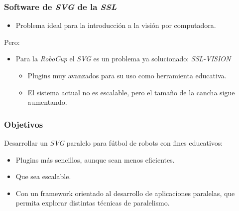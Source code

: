 \documentclass[11pt,a4paper,spanish]{beamer}
\begin{document}
\begin{frame}

\frametitle{Software de \emph{SVG} de la \emph{SSL}}

\begin{itemize}

	\item Problema ideal para la introducción a la visión por computadora.

\end{itemize}

Pero:

\begin{itemize}

	\item Para la \emph{RoboCup} el \emph{SVG} es un problema ya
		solucionado: \emph{SSL-VISION}

	\begin{itemize}
		
		\item Plugins muy avanzados para su uso como herramienta
			educativa.

		\item El sistema actual no es escalable, pero el tamaño de la
			cancha sigue aumentando.

	\end{itemize}

\end{itemize}

\end{frame}

\begin{frame}

\frametitle{Objetivos}

Desarrollar un \emph{SVG} paralelo para fútbol de robots con fines educativos:

\begin{itemize}

	\item Plugins más sencillos, aunque sean menos eficientes.

	\item Que sea escalable.

	\item Con un framework orientado al desarrollo de aplicaciones
		paralelas, que permita explorar distintas técnicas de
		paralelismo.

\end{itemize}

\end{frame}
\end{document}
